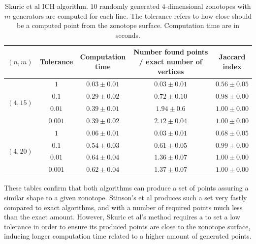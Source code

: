 \begin{table}[!ht]
    \centering
    \begin{tabular}{|c|c|c|c|c|}
    \hline
    $(n,m)$ & Tolerance & \makecell{Computation \\ time} & \makecell{Number found points \\ / exact number of vertices} & \makecell{Jaccard \\ index} \\
    \hline
    \hline

    \multirow{ 4}{*}{$(4,15)$} & $1$ & $0.03\pm 0.01$ & $0.03\pm 0.01$ & $0.56\pm 0.05$  \\
    \cline{2-5}
    & $0.1$ & $0.29\pm 0.02$ & $0.72\pm 0.10$ & $0.98\pm 0.00$ \\
    \cline{2-5}
    & $0.01$ & $0.39\pm 0.01$ & $1.94\pm 0
    .6$ & $\mathbf{1.00\pm 0.00}$\\
    \cline{2-5}
    & $0.001$ & $0.39\pm 0.02$ & $2.12\pm 0.04$ & $\mathbf{1.00\pm 0.00}$ \\
    \hline
    \multirow{ 4}{*}{$(4,20)$}& $1$ & $0.06\pm 0.01$ & $0.03\pm 0.01$ & $0.68\pm 0.05$ \\
    \cline{2-5}
    & $0.1$ & $0.54\pm 0.03$ & $0.61\pm 0.05$ & $0.99\pm 0.00$ \\
    \cline{2-5}
    & $0.01$ & $0.64\pm 0.04$ & $1.36\pm 0.07$ & $\mathbf{1.00\pm 0.00}$ \\
    \cline{2-5}
    & $0.001$ & $0.62\pm 0.04$ & $1.37\pm 0.07$ & $\mathbf{1.00\pm 0.00}$ \\
    \hline
    \end{tabular}
    \caption{Skuric et al ICH algorithm. $10$ randomly generated $4$-dimensional zonotopes with $m$ generators are computed for each line. The tolerance refers to how close should be a computed point from the zonotope surface. Computation time are in seconds.}
    \label{tab:approx_vertex_set_ich}
\end{table}

These tables confirm that both algorithms can produce a set of points assuring a similar shape to a given zonotope. Stinson's et al produces such a set very fastly compared to exact algorithms, and with a number of required points much less than the exact amount. However, Skuric et al's method requires a to set a low tolerance in order to ensure its produced points are close to the zonotope surface, inducing longer computation time related to a higher amount of generated points. 

